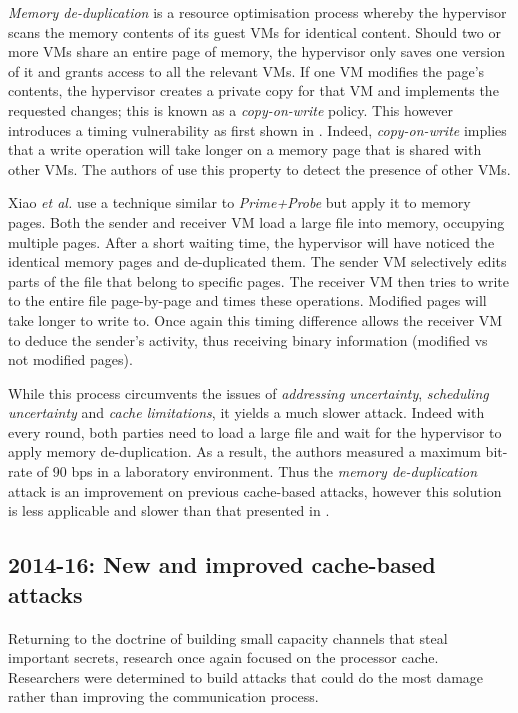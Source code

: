 \documentclass[orivec,envcountsame, a4paper, 11pt]{llncs}
\begin{document}
\textit{Memory de-duplication} is a resource optimisation process whereby the hypervisor scans the memory contents of its guest VMs for identical content. Should two or more VMs share an entire page of memory, the hypervisor only saves one version of it and grants access to all the relevant VMs. If one VM modifies the page's contents, the hypervisor creates a private copy for that VM and implements the requested changes; this is known as a \textit{copy-on-write} policy. This however introduces a timing vulnerability as first shown in \cite{Suzaki2011}. Indeed, \textit{copy-on-write} implies that a write operation will take longer on a memory page that is shared with other VMs. The authors of \cite{Suzaki2011} use this property to detect the presence of other VMs.

Xiao \textit{et al.} \cite{Xiao2013} use a technique similar to \textit{Prime+Probe} but apply it to memory pages. Both the sender and receiver VM load a large file into memory, occupying multiple pages. After a short waiting time, the hypervisor will have noticed the identical memory pages and de-duplicated them. The sender VM selectively edits parts of the file that belong to specific pages. The receiver VM then tries to write to the entire file page-by-page and times these operations. Modified pages will take longer to write to. Once again this timing difference allows the receiver VM to deduce the sender's activity, thus receiving binary information (modified vs not modified pages).

While this process circumvents the issues of \textit{addressing uncertainty}, \textit{scheduling uncertainty} and \textit{cache limitations}, it yields a much slower attack. Indeed with every round, both parties need to load a large file and wait for the hypervisor to apply memory de-duplication. As a result, the authors measured a maximum bit-rate of 90 bps in a laboratory environment. Thus the \textit{memory de-duplication} attack is an improvement on previous cache-based attacks, however this solution is less applicable and slower than that presented in \cite{Wu2012}.

\subsection{2014-16: New and improved cache-based attacks}
\label{sec:techniques}


\paragraph{} Returning to the doctrine of building small capacity channels that steal important secrets, research once again focused on the processor cache. Researchers were determined to build attacks that could do the most damage rather than improving the communication process.
\end{document}
